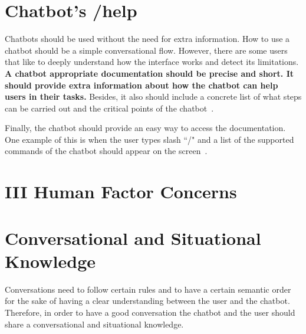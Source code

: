 \documentclass[a4paper,10pt]{article}
\begin{document}



\section{Chatbot's /help}

Chatbots should be used without the need for extra information. How to use a chatbot should be a simple conversational flow. However, there are some users that like to deeply understand how the interface works and detect its limitations. \textbf{A chatbot appropriate documentation should be precise and short. It should provide extra information about how the chatbot can help users in their tasks.} Besides, it also should include a concrete list of what steps can be carried out and the critical points of the chatbot~\cite{HeuristicsWebPage}. 

Finally, the chatbot should provide an easy way to access the documentation. One example of this is when the user types slash ``/" and a list of the supported commands of the chatbot should appear on the screen~\cite{botfather}.  

\section*{III Human Factor Concerns}

\section{Conversational and Situational Knowledge}

Conversations need to follow certain rules and to have a certain semantic order for the sake of having a clear understanding between the user and the chatbot. Therefore, in order to have a good conversation the chatbot and the user should share a conversational and situational knowledge. 
\end{document}

